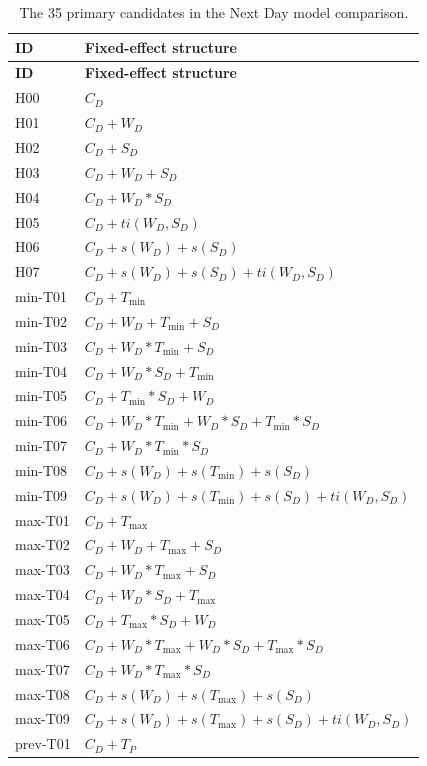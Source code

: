 \documentclass[insects,article,submit,pdftex,moreauthors]{Definitions/mdpi}
\begin{document}
\begin{appendix}
\begin{longtable}{@{}p{}p{}@{}}
\caption{The 35 primary candidates in the Next Day model comparison.} \label{tab:nextday_candidates} \\
\toprule
\textbf{ID} & \textbf{Fixed-effect structure} \\
\midrule
\endfirsthead
\toprule
\textbf{ID} & \textbf{Fixed-effect structure} \\
\midrule
\endhead
H00 & $C_D$ \\
H01 & $C_D + W_D$ \\
H02 & $C_D + S_D$ \\
H03 & $C_D + W_D + S_D$ \\
H04 & $C_D + W_D * S_D$ \\
H05 & $C_D + ti(W_D,S_D)$ \\
H06 & $C_D + s(W_D) + s(S_D)$ \\
H07 & $C_D + s(W_D) + s(S_D) + ti(W_D,S_D)$ \\
min-T01 & $C_D + T_{\min}$ \\
min-T02 & $C_D + W_D + T_{\min} + S_D$ \\
min-T03 & $C_D + W_D * T_{\min} + S_D$ \\
min-T04 & $C_D + W_D * S_D + T_{\min}$ \\
min-T05 & $C_D + T_{\min} * S_D + W_D$ \\
min-T06 & $C_D + W_D * T_{\min} + W_D * S_D + T_{\min} * S_D$ \\
min-T07 & $C_D + W_D * T_{\min} * S_D$ \\
min-T08 & $C_D + s(W_D) + s(T_{\min}) + s(S_D)$ \\
min-T09 & $C_D + s(W_D) + s(T_{\min}) + s(S_D) + ti(W_D,S_D)$ \\
max-T01 & $C_D + T_{\max}$ \\
max-T02 & $C_D + W_D + T_{\max} + S_D$ \\
max-T03 & $C_D + W_D * T_{\max} + S_D$ \\
max-T04 & $C_D + W_D * S_D + T_{\max}$ \\
max-T05 & $C_D + T_{\max} * S_D + W_D$ \\
max-T06 & $C_D + W_D * T_{\max} + W_D * S_D + T_{\max} * S_D$ \\
max-T07 & $C_D + W_D * T_{\max} * S_D$ \\
max-T08 & $C_D + s(W_D) + s(T_{\max}) + s(S_D)$ \\
max-T09 & $C_D + s(W_D) + s(T_{\max}) + s(S_D) + ti(W_D,S_D)$ \\
prev-T01 & $C_D + T_P$ \\

\end{longtable}
\end{appendix}
\end{document}
